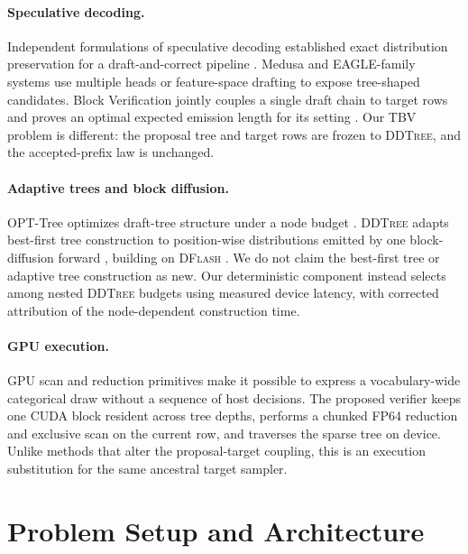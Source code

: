 \documentclass{article}
\newcommand{\TBV}{\textnormal{\textsc{TBV}}}
\newcommand{\DFlash}{\textnormal{\textsc{DFlash}}}
\newcommand{\DDTree}{\textnormal{\textsc{DDTree}}}
\begin{document}
\paragraph{Speculative decoding.}
Independent formulations of speculative decoding established exact distribution preservation for a draft-and-correct pipeline \citep{leviathan2023fast,chen2023accelerating}.  Medusa \citep{cai2024medusa} and EAGLE-family systems \citep{li2024eagle2} use multiple heads or feature-space drafting to expose tree-shaped candidates.  Block Verification jointly couples a single draft chain to target rows and proves an optimal expected emission length for its setting \citep{sun2024block}.  Our \TBV{} problem is different: the proposal tree and target rows are frozen to \DDTree, and the accepted-prefix law is unchanged.

\paragraph{Adaptive trees and block diffusion.}
OPT-Tree optimizes draft-tree structure under a node budget \citep{wang2025opttree}.  \DDTree{} adapts best-first tree construction to position-wise distributions emitted by one block-diffusion forward \citep{ringel2026ddtree}, building on \DFlash{} \citep{chen2026dflash}.  We do not claim the best-first tree or adaptive tree construction as new.  Our deterministic component instead selects among nested \DDTree{} budgets using measured device latency, with corrected attribution of the node-dependent construction time.

\paragraph{GPU execution.}
GPU scan and reduction primitives make it possible to express a vocabulary-wide categorical draw without a sequence of host decisions.  The proposed verifier keeps one CUDA block resident across tree depths, performs a chunked FP64 reduction and exclusive scan on the current row, and traverses the sparse tree on device.  Unlike methods that alter the proposal-target coupling, this is an execution substitution for the same ancestral target sampler.

\section{Problem Setup and Architecture}
\label{sec:setup}
\end{document}
